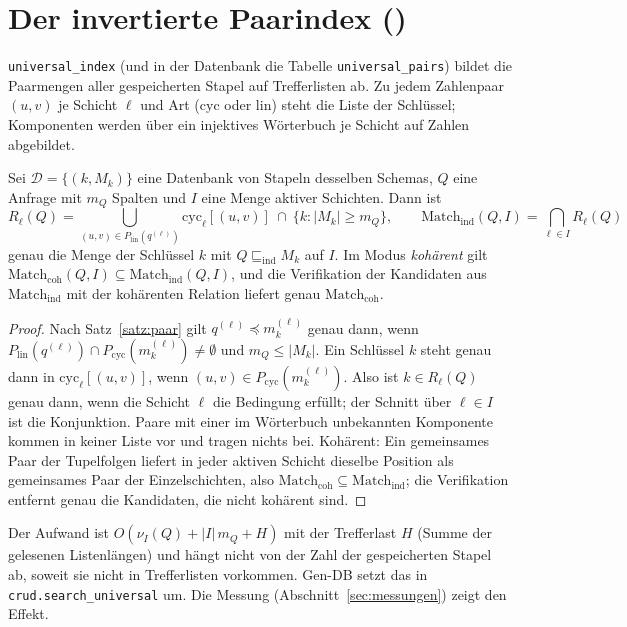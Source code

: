 \section{Der invertierte Paarindex ()}
\label{sec:index}

\texttt{universal\_index} (und in der Datenbank die Tabelle \texttt{universal\_pairs}) bildet die Paarmengen aller gespeicherten Stapel auf Trefferlisten ab. Zu jedem Zahlenpaar $(u,v)$ je Schicht $\ell$ und Art ($\mathrm{cyc}$ oder $\mathrm{lin}$) steht die Liste der Schlüssel; Komponenten werden über ein injektives Wörterbuch je Schicht auf Zahlen abgebildet.

\begin{satz}
	\label{satz:index}
	Sei $\mathcal{D}=\{(k,M_k)\}$ eine Datenbank von Stapeln desselben Schemas, $Q$ eine Anfrage mit $m_Q$ Spalten und $I$ eine Menge aktiver Schichten. Dann ist
	\[
	R_\ell(Q)=\bigcup_{(u,v)\in P_{\mathrm{lin}}(q^{(\ell)})}\mathrm{cyc}_\ell[(u,v)]\ \cap\ \{k : |M_k|\ge m_Q\},\qquad \mathrm{Match}_{\mathrm{ind}}(Q,I)=\bigcap_{\ell\in I}R_\ell(Q)
	\]
	genau die Menge der Schlüssel $k$ mit $Q\sqsubseteq_{\mathrm{ind}}M_k$ auf $I$. Im Modus \emph{kohärent} gilt $\mathrm{Match}_{\mathrm{coh}}(Q,I)\subseteq\mathrm{Match}_{\mathrm{ind}}(Q,I)$, und die Verifikation der Kandidaten aus $\mathrm{Match}_{\mathrm{ind}}$ mit der kohärenten Relation liefert genau $\mathrm{Match}_{\mathrm{coh}}$.
\end{satz}

\begin{proof}
	Nach Satz~\ref{satz:paar} gilt $q^{(\ell)}\preceq m_k^{(\ell)}$ genau dann, wenn $P_{\mathrm{lin}}(q^{(\ell)})\cap P_{\mathrm{cyc}}(m_k^{(\ell)})\ne\emptyset$ und $m_Q\le|M_k|$. Ein Schlüssel $k$ steht genau dann in $\mathrm{cyc}_\ell[(u,v)]$, wenn $(u,v)\in P_{\mathrm{cyc}}(m_k^{(\ell)})$. Also ist $k\in R_\ell(Q)$ genau dann, wenn die Schicht $\ell$ die Bedingung erfüllt; der Schnitt über $\ell\in I$ ist die Konjunktion. Paare mit einer im Wörterbuch unbekannten Komponente kommen in keiner Liste vor und tragen nichts bei. Kohärent: Ein gemeinsames Paar der Tupelfolgen liefert in jeder aktiven Schicht dieselbe Position als gemeinsames Paar der Einzelschichten, also $\mathrm{Match}_{\mathrm{coh}}\subseteq\mathrm{Match}_{\mathrm{ind}}$; die Verifikation entfernt genau die Kandidaten, die nicht kohärent sind.
\end{proof}

Der Aufwand ist $O(\nu_I(Q)+|I|\,m_Q+H)$ mit der Trefferlast $H$ (Summe der gelesenen Listenlängen) und hängt nicht von der Zahl der gespeicherten Stapel ab, soweit sie nicht in Trefferlisten vorkommen. Gen-DB setzt das in \texttt{crud.search\_universal} um. Die Messung (Abschnitt~\ref{sec:messungen}) zeigt den Effekt.


